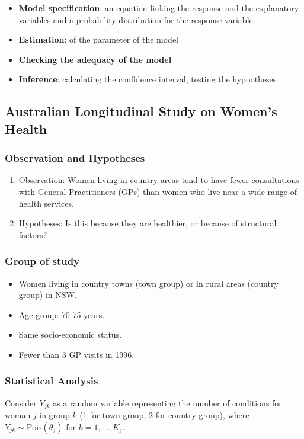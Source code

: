 \documentclass[11pt]{article}
\begin{document}
\begin{itemize}
    \item \textbf{Model specification}: an equation linking the response and the explanatory variables and a probability distribution for the response variable
    \item \textbf{Estimation}: of the parameter of the model
    \item \textbf{Checking the adequacy of the model}
    \item \textbf{Inference}: calculating the confidence interval, testing the hypootheses
\end{itemize}

\subsection{Australian Longitudinal Study on Women's Health}

\subsubsection{Observation and Hypotheses}
\begin{enumerate}
    \item Observation: Women living in country areas tend to have fewer consultations with General Practitioners (GPs) than women who live near a wide range of health services.
    \item Hypotheses: Is this because they are healthier, or because of structural factors?
\end{enumerate}

\subsubsection{Group of study}
\begin{itemize}
    \item Women living in country towns (town group) or in rural areas (country group) in NSW.
    \item Age group: 70-75 years.
    \item Same socio-economic status.
    \item Fewer than 3 GP visits in 1996.
\end{itemize}

\subsubsection{Statistical Analysis}
Consider \( Y_{jk} \) as a random variable representing the number of conditions for woman \( j \) in group \( k \) (1 for town group, 2 for country group), where \( Y_{jk} \sim \text{Pois}(\theta_j) \) for \( k = 1, \ldots, K_j \).
\end{document}
